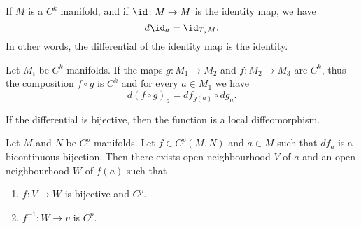 \begin{lemma}       \label{LEMooEGITooXbAPDe}
	If \( M\) is a \( C^k\) manifold, and if \( \id\colon M\to M\) is the identity map, we have
	\begin{equation}
		d\id_a=\id_{T_aM}.
	\end{equation}
	In other words, the differential of the identity map is the identity.
\end{lemma}

\begin{lemma}       \label{LEMooGRRAooXxDMuw}
	Let \( M_i\) be \( C^k\) manifolds. If the maps \( g\colon M_1\to M_2\) and \( f\colon M_2\to M_3 \) are \( C^k\), thus the composition \( f\circ g\) is \( C^k\) and for every \( a\in M_1\) we have
	\begin{equation}
		d(f\circ g)_a=df_{g(a)}\circ dg_a.
	\end{equation}
\end{lemma}


If the differential is bijective, then the function is a local diffeomorphism.
\begin{theorem}	\label{THOooDWEXooMClWVi}
	Let \( M\) and \( N\) be \( C^p\)-manifolds. Let \( f\in C^p(M,N)\) and \( a\in M\) such that \( df_a\) is a bicontinuous bijection. Then there exists open neighbourhood \( V\) of \( a\) and an open neighbourhood \( W\) of \( f(a)\) such that
	\begin{enumerate}
		\item
		      \(f \colon V\to W  \) is bijective and \( C^p\).
		\item
		      \(f^{-1} \colon W\to v  \) is \( C^p\).
	\end{enumerate}
\end{theorem}

